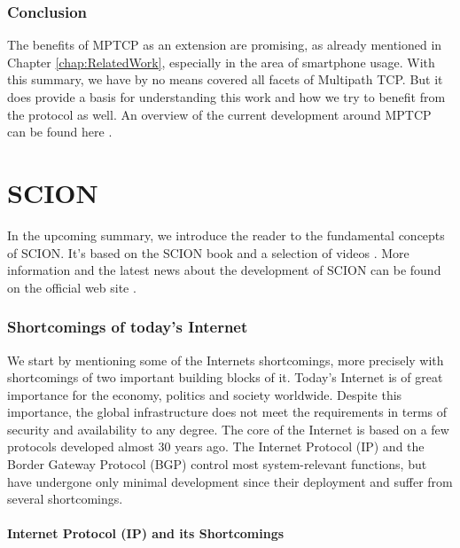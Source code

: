 \subsubsection{Conclusion}

The benefits of MPTCP as an extension are promising, as already mentioned in Chapter \ref{chap:RelatedWork}, especially in the area of smartphone usage.  With this summary, we have by no means covered all facets of Multipath TCP. But it does provide a basis for understanding this work and how we try to benefit from the protocol as well. An overview of the current development around MPTCP can be found here \cite{MPTCPWebMain}.

\section{SCION}
\label{sec:SCION}

In the upcoming summary, we introduce the reader to the fundamental concepts of SCION. It's based on the SCION book \cite{SCIONBook} and a selection of videos \cite{SCIONWebVideos}. More information and the latest news about the development of SCION can be found on the official web site \cite{SCIONWebMain}.

\subsubsection{Shortcomings of today's Internet}

We start by mentioning some of the Internets shortcomings, more precisely with shortcomings of two important building blocks of it. Today's Internet is of great importance for the economy, politics and society worldwide. Despite this importance, the global infrastructure does not meet the requirements in terms of security and availability to any degree. The core of the Internet is based on a few protocols developed almost 30 years ago. The Internet Protocol (IP) and the Border Gateway Protocol (BGP) control most system-relevant functions, but have undergone only minimal development since their deployment and suffer from several shortcomings.

\paragraph{Internet Protocol (IP) and its Shortcomings}

